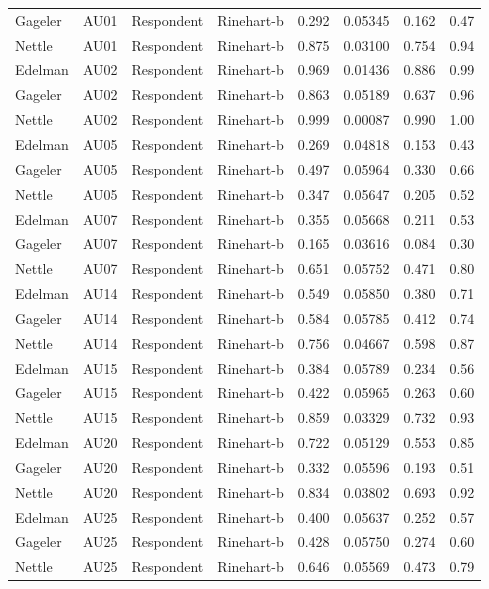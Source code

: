 \documentclass{monashthesis}
\begin{document}
\begin{center}
\begin{longtable}{llllllll}
Gageler & AU01 & Respondent & Rinehart-b & 0.292 & 0.05345 & 0.162 & 0.47 \\
Nettle & AU01 & Respondent & Rinehart-b & 0.875 & 0.03100 & 0.754 & 0.94 \\
Edelman & AU02 & Respondent & Rinehart-b & 0.969 & 0.01436 & 0.886 & 0.99 \\
Gageler & AU02 & Respondent & Rinehart-b & 0.863 & 0.05189 & 0.637 & 0.96 \\
Nettle & AU02 & Respondent & Rinehart-b & 0.999 & 0.00087 & 0.990 & 1.00 \\
Edelman & AU05 & Respondent & Rinehart-b & 0.269 & 0.04818 & 0.153 & 0.43 \\
Gageler & AU05 & Respondent & Rinehart-b & 0.497 & 0.05964 & 0.330 & 0.66 \\
Nettle & AU05 & Respondent & Rinehart-b & 0.347 & 0.05647 & 0.205 & 0.52 \\
Edelman & AU07 & Respondent & Rinehart-b & 0.355 & 0.05668 & 0.211 & 0.53 \\
Gageler & AU07 & Respondent & Rinehart-b & 0.165 & 0.03616 & 0.084 & 0.30 \\
Nettle & AU07 & Respondent & Rinehart-b & 0.651 & 0.05752 & 0.471 & 0.80 \\
Edelman & AU14 & Respondent & Rinehart-b & 0.549 & 0.05850 & 0.380 & 0.71 \\
Gageler & AU14 & Respondent & Rinehart-b & 0.584 & 0.05785 & 0.412 & 0.74 \\
Nettle & AU14 & Respondent & Rinehart-b & 0.756 & 0.04667 & 0.598 & 0.87 \\
Edelman & AU15 & Respondent & Rinehart-b & 0.384 & 0.05789 & 0.234 & 0.56 \\
Gageler & AU15 & Respondent & Rinehart-b & 0.422 & 0.05965 & 0.263 & 0.60 \\
Nettle & AU15 & Respondent & Rinehart-b & 0.859 & 0.03329 & 0.732 & 0.93 \\
Edelman & AU20 & Respondent & Rinehart-b & 0.722 & 0.05129 & 0.553 & 0.85 \\
Gageler & AU20 & Respondent & Rinehart-b & 0.332 & 0.05596 & 0.193 & 0.51 \\
Nettle & AU20 & Respondent & Rinehart-b & 0.834 & 0.03802 & 0.693 & 0.92 \\
Edelman & AU25 & Respondent & Rinehart-b & 0.400 & 0.05637 & 0.252 & 0.57 \\
Gageler & AU25 & Respondent & Rinehart-b & 0.428 & 0.05750 & 0.274 & 0.60 \\
Nettle & AU25 & Respondent & Rinehart-b & 0.646 & 0.05569 & 0.473 & 0.79 \\
\end{longtable}
\end{center}

\printbibliography[heading=bibintoc]
\end{document}
